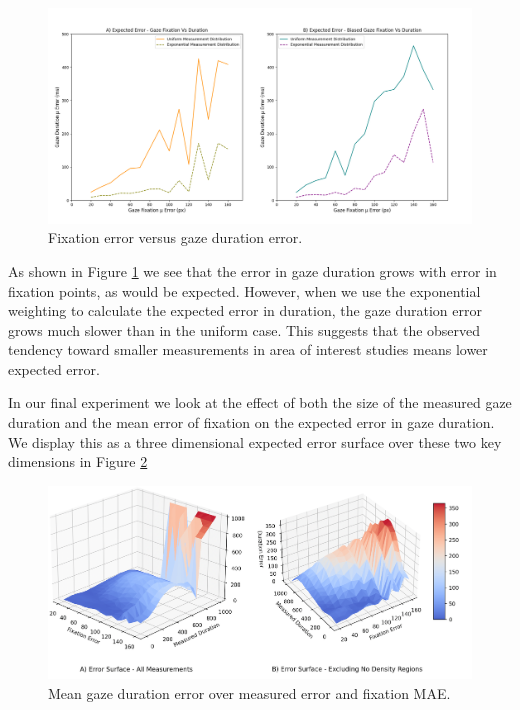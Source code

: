 \documentclass[12pt,a4paper]{article}
\numberwithin{equation}{section}
\begin{document}
\begin{figure}[h!]
\centering
\includegraphics[scale=0.4]{../results/Fixation_vs_duration_error.png}
\caption{Fixation error versus gaze duration error.}
\label{fig:fixation_vs_duration}
\end{figure}

As shown in Figure \ref{fig:fixation_vs_duration} we see that the error in gaze duration
grows with error in fixation points, as would be expected. However, when we use the exponential
weighting to calculate the expected error in duration, the gaze duration error grows much slower
than in the uniform case. This suggests that the observed tendency toward smaller measurements
in area of interest studies means lower expected error.

In our final experiment we look at the effect of both the size of the measured 
gaze duration and the mean error of fixation on the expected error in gaze duration.
We display this as a three dimensional expected error surface over these two key dimensions
in Figure \ref{fig:error_surface}

\begin{figure}[h!]
\centering
\includegraphics[scale=0.4]{../results/Error_surface.png}
\caption{Mean gaze duration error over measured error and fixation MAE.}
\label{fig:error_surface}
\end{figure}
\end{document}
